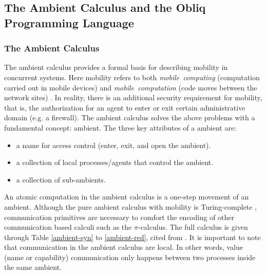 \subsection{The Ambient Calculus and the Obliq Programming Language}
\label{sec:ambient}

\subsubsection{The Ambient Calculus}
The ambient calculus provides a formal basis for describing mobility in concurrent systems.  Here mobility refers to both {\it{mobile\ computing}} (computation carried out in mobile devices) and {\it{mobile\ computation}} (code moves between the network sites) \citep{Cardelli98mobileambients}.  In reality, there is an additional security requirement for mobility, that is, the authorization for an agent to enter or exit certain administrative domain (e.g. a firewall).  The ambient calculus solves the above problems with a fundamental concept: ambient.  The three key attributes of a ambient are:
\begin{itemize}
  \item a name for access control (enter, exit, and open the ambient).
  \item a collection of local processes/agents that control the ambient.  
  \item a collection of sub-ambients. 
\end{itemize}

An atomic computation in the ambient calculus is a one-step movement of an ambient.  Although the pure ambient calculus with mobility is Turing-complete \citep{Cardelli98mobileambients}, communication primitives are necessary to comfort the encoding of other communication based calculi such as the $\pi$-calculus.  The full calculus is given through Table \ref{ambient-syn} to \ref{ambient-red}, cited from \citep{Cardelli98mobileambients}.  It is important to note that communication in the ambient calculus are local.  In other words, value (name or capability) communication only happens between two processes inside the same ambient.


